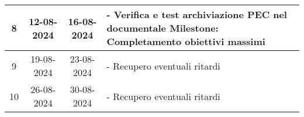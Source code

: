 \begin{longtable}{|c|c|c|p{8cm}|}
    \hline
    8                  & 12-08-2024   & 16-08-2024  &
    - Verifica e test archiviazione PEC nel documentale \newline
    \textbf{Milestone:} Completamento obiettivi massimi                                                          \\
    \hline
    9                  & 19-08-2024   & 23-08-2024  &
    - Recupero eventuali ritardi                                                                                 \\
    \hline
    10                 & 26-08-2024   & 30-08-2024  &
    - Recupero eventuali ritardi                                                                                 \\
    \hline

\end{longtable}